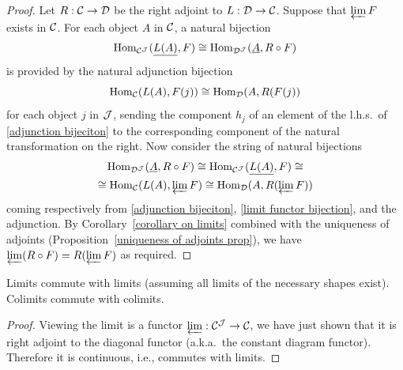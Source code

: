 \begin{proof}
    Let $R:\mathcal{C} \to \mathcal{D} $ be the right adjoint to $L:\mathcal{D} \to\mathcal{C} $. Suppose that $\varprojlim F$ exists in $\mathcal{C} $. For each object $A$ in $\mathcal{C} $, a natural bijection
    \[\operatorname{Hom}_{\mathcal{C} ^{\mathcal{J}} }(\underline{L(A)},F)\cong \operatorname{Hom}_{\mathcal{D} ^{\mathcal{J}} }(\underline{A},R\circ F) \label{adjunction bijeciton}\]
    is provided by the natural adjunction bijection
    \[\operatorname{Hom}_{\mathcal{C} }(L(A),F(j))\cong \operatorname{Hom}_{\mathcal{D} }(A,R(F(j))\]
    for each object $j$ in $\mathcal{J} $, sending the component $h_j$ of an element of the l.h.s.~of \eqref{adjunction bijeciton} to the corresponding component of the natural transformation on the right. Now consider the string of natural bijections
    \begin{multline}
        \operatorname{Hom}_{\mathcal{D} ^{\mathcal{J}} }(\underline{A},R\circ F)\cong \operatorname{Hom}_{\mathcal{C} ^{\mathcal{J}} }(\underline{L(A)},F)\cong \\ 
        \cong \operatorname{Hom}_{\mathcal{C} }(L(A),\varprojlim F)\cong \operatorname{Hom}_{\mathcal{D} }(A,R(\varprojlim F))
    \end{multline}
    coming respectively from \eqref{adjunction bijeciton}, \eqref{limit functor bijection}, and the adjunction. By Corollary~\ref{corollary on limits} combined with the uniqueness of adjoints (Proposition~\ref{uniqueness of adjoints prop}), we have $\varprojlim(R\circ F)= R(\varprojlim F)$ as required.
\end{proof}
\begin{cor}
    Limits commute with limits (assuming all limits of the necessary shapes exist). Colimits commute with colimits.
\end{cor}
\begin{proof}
    Viewing the limit is a functor  $\varprojlim:\mathcal{C}^{\mathcal{J}}\to \mathcal{C}$, we have just shown that it is right adjoint to the diagonal functor (a.k.a.~the constant diagram functor). Therefore it is continuous, i.e., commutes with limits. 
\end{proof}

